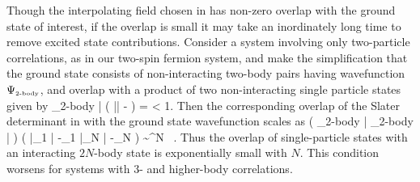 Though the interpolating field chosen in  has non-zero overlap with the ground state of interest, if the overlap is small it may take an inordinately long time to remove excited state contributions. Consider a system involving only two-particle correlations, as in our two-spin fermion system, and make the simplification that the ground state consists of non-interacting two-body pairs having wavefunction $\Psi_{\mbox{\tiny 2-body}}$, and overlap with a product of two non-interacting single particle states given by
\beq
\langle \Psi_{\mbox{\tiny 2-body}} | \left( |\rangle \otimes | -  \rangle \right) = \epsilon < 1.
\eeq
Then the corresponding overlap of the Slater determinant in  with the ground state wavefunction scales as
\beq
\left( \langle \Psi_{\mbox{\tiny 2-body}} | \otimes \cdots \otimes \langle \Psi_{\mbox{\tiny 2-body}} | \right) \left( |_1 \rangle \otimes | -_1 \rangle \otimes \cdots \otimes |_N \rangle \otimes | -_N \rangle \right) \sim \epsilon^N \ .
\eeq
Thus the overlap of single-particle states with an interacting $2N$-body state is exponentially small with $N$. This condition worsens for systems with $3$- and higher-body correlations.

